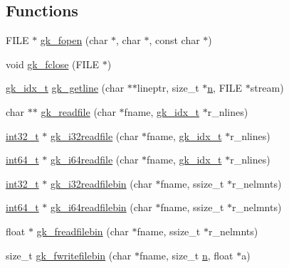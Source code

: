 \subsection*{Functions}
\begin{DoxyCompactItemize}
\item 
F\+I\+LE $\ast$ \hyperlink{a00077_ab2b996e10c5bccb30204d81804adfd24}{gk\+\_\+fopen} (char $\ast$, char $\ast$, const char $\ast$)
\item 
void \hyperlink{a00077_a0fd03cab5187904b005485109d9fa2b5}{gk\+\_\+fclose} (F\+I\+LE $\ast$)
\item 
\hyperlink{a00083_a899f9d8c47b1ca0c2fead41097f4bde2}{gk\+\_\+idx\+\_\+t} \hyperlink{a00077_ad8263f64108434d7ebab9799b5ab9632}{gk\+\_\+getline} (char $\ast$$\ast$lineptr, size\+\_\+t $\ast$\hyperlink{a00623_a781a04ab095280f838ff3eb0e51312e0}{n}, F\+I\+LE $\ast$stream)
\item 
char $\ast$$\ast$ \hyperlink{a00077_ad13e689608e193482a6f30b1ade87814}{gk\+\_\+readfile} (char $\ast$fname, \hyperlink{a00083_a899f9d8c47b1ca0c2fead41097f4bde2}{gk\+\_\+idx\+\_\+t} $\ast$r\+\_\+nlines)
\item 
\hyperlink{a00119_a37994e3b11c72957c6f454c6ec96d43d}{int32\+\_\+t} $\ast$ \hyperlink{a00077_a201c46a9a2bf9c06a917f259d109b7ee}{gk\+\_\+i32readfile} (char $\ast$fname, \hyperlink{a00083_a899f9d8c47b1ca0c2fead41097f4bde2}{gk\+\_\+idx\+\_\+t} $\ast$r\+\_\+nlines)
\item 
\hyperlink{a00119_a67a9885ef4908cb72ce26d75b694386c}{int64\+\_\+t} $\ast$ \hyperlink{a00077_a8cb19aa95a831aa745f6e04e1cc0b204}{gk\+\_\+i64readfile} (char $\ast$fname, \hyperlink{a00083_a899f9d8c47b1ca0c2fead41097f4bde2}{gk\+\_\+idx\+\_\+t} $\ast$r\+\_\+nlines)
\item 
\hyperlink{a00119_a37994e3b11c72957c6f454c6ec96d43d}{int32\+\_\+t} $\ast$ \hyperlink{a00077_afbb9b4e2327d298a79924028441a0fdb}{gk\+\_\+i32readfilebin} (char $\ast$fname, ssize\+\_\+t $\ast$r\+\_\+nelmnts)
\item 
\hyperlink{a00119_a67a9885ef4908cb72ce26d75b694386c}{int64\+\_\+t} $\ast$ \hyperlink{a00077_aca460764497638a612f886a089662416}{gk\+\_\+i64readfilebin} (char $\ast$fname, ssize\+\_\+t $\ast$r\+\_\+nelmnts)
\item 
float $\ast$ \hyperlink{a00077_a825d4634e2e656bc3dc9f3af0c9b1d5d}{gk\+\_\+freadfilebin} (char $\ast$fname, ssize\+\_\+t $\ast$r\+\_\+nelmnts)
\item 
size\+\_\+t \hyperlink{a00077_a44ee9129d983bd435f96f9c1404f603d}{gk\+\_\+fwritefilebin} (char $\ast$fname, size\+\_\+t \hyperlink{a00623_a781a04ab095280f838ff3eb0e51312e0}{n}, float $\ast$a)

\end{DoxyCompactItemize}
